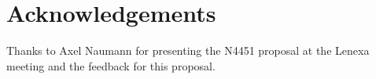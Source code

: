 \section{Acknowledgements}

Thanks to Axel Naumann for presenting the N4451 proposal at the Lenexa meeting
and the feedback for this proposal.
